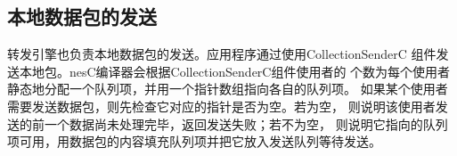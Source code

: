 \subsection{本地数据包的发送}
转发引擎也负责本地数据包的发送。应用程序通过使用CollectionSenderC
组件发送本地包。nesC编译器会根据CollectionSenderC组件使用者的
个数为每个使用者静态地分配一个队列项，并用一个指针数组指向各自的队列项。
如果某个使用者需要发送数据包，则先检查它对应的指针是否为空。若为空，
则说明该使用者发送的前一个数据尚未处理完毕，返回发送失败；若不为空，
则说明它指向的队列项可用，用数据包的内容填充队列项并把它放入发送队列等待发送。
